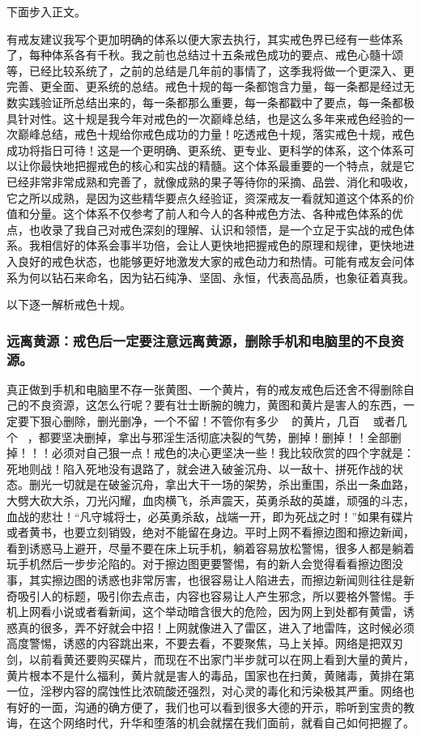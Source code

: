 下面步入正文。

有戒友建议我写个更加明确的体系以便大家去执行，其实戒色界已经有一些体系了，每种体系各有千秋。我之前也总结过十五条戒色成功的要点、戒色心髓十颂等，已经比较系统了，之前的总结是几年前的事情了，这季我将做一个更深入、更完善、更全面、更系统的总结。戒色十规的每一条都饱含力量，每一条都是经过无数实践验证所总结出来的，每一条都那么重要，每一条都戳中了要点，每一条都极具针对性。这十规是我今年对戒色的一次巅峰总结，也是这么多年来戒色经验的一次巅峰总结，戒色十规给你戒色成功的力量！吃透戒色十规，落实戒色十规，戒色成功将指日可待！这是一个更明确、更系统、更专业、更科学的体系，这个体系可以让你最快地把握戒色的核心和实战的精髓。这个体系最重要的一个特点，就是它已经非常非常成熟和完善了，就像成熟的果子等待你的采摘、品尝、消化和吸收，它之所以成熟，是因为这些精华要点久经验证，资深戒友一看就知道这个体系的价值和分量。这个体系不仅参考了前人和今人的各种戒色方法、各种戒色体系的优点，也收录了我自己对戒色深刻的理解、认识和领悟，是一个立足于实战的戒色体系。我相信好的体系会事半功倍，会让人更快地把握戒色的原理和规律，更快地进入良好的戒色状态，也能够更好地激发大家的戒色动力和热情。可能有戒友会问体系为何以钻石来命名，因为钻石纯净、坚固、永恒，代表高品质，也象征着真我。

以下逐一解析戒色十规。

\subsubsection{远离黄源：戒色后一定要注意远离黄源，删除手机和电脑里的不良资源。}

真正做到手机和电脑里不存一张黄图、一个黄片，有的戒友戒色后还舍不得删除自己的不良资源，这怎么行呢？要有壮士断腕的魄力，黄图和黄片是害人的东西，一定要下狠心删除，删光删净，一个不留！不管你有多少 \unit{\giga\byte} 的黄片，几百 \unit{\giga\byte} 或者几个 \unit{\tera\byte}，都要坚决删掉，拿出与邪淫生活彻底决裂的气势，删掉！删掉！！全部删掉！！！必须对自己狠一点！戒色的决心更坚决一些！我比较欣赏的四个字就是：死地则战！陷入死地没有退路了，就会进入破釜沉舟、以一敌十、拼死作战的状态。删光一切就是在破釜沉舟，拿出大干一场的架势，杀出重围，杀出一条血路，大劈大砍大杀，刀光闪耀，血肉横飞，杀声震天，英勇杀敌的英雄，顽强的斗志，血战的悲壮！“凡守城将士，必英勇杀敌，战端一开，即为死战之时！”如果有碟片或者黄书，也要立刻销毁，绝对不能留在身边。平时上网不看擦边图和擦边新闻，看到诱惑马上避开，尽量不要在床上玩手机，躺着容易放松警惕，很多人都是躺着玩手机然后一步步沦陷的。对于擦边图更要警惕，有的新人会觉得看看擦边图没事，其实擦边图的诱惑也非常厉害，也很容易让人陷进去，而擦边新闻则往往是新奇吸引人的标题，吸引你去点击，内容也容易让人产生邪念，所以要格外警惕。手机上网看小说或者看新闻，这个举动暗含很大的危险，因为网上到处都有黄雷，诱惑真的很多，弄不好就会中招！上网就像进入了雷区，进入了地雷阵，这时候必须高度警惕，诱惑的内容跳出来，不要去看，不要聚焦，马上关掉。网络是把双刃剑，以前看黄还要购买碟片，而现在不出家门半步就可以在网上看到大量的黄片，黄片根本不是什么福利，黄片就是害人的毒品，国家也在扫黄，黄赌毒，黄排在第一位，淫秽内容的腐蚀性比浓硫酸还强烈，对心灵的毒化和污染极其严重。网络也有好的一面，沟通的确方便了，我们也可以看到很多大德的开示，聆听到宝贵的教诲，在这个网络时代，升华和堕落的机会就摆在我们面前，就看自己如何把握了。

